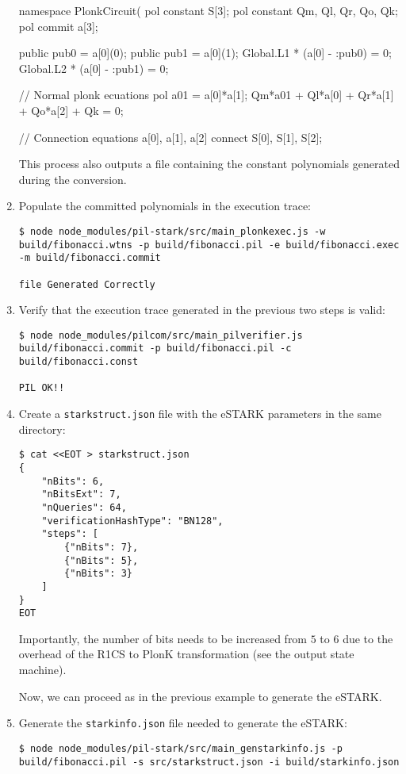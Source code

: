 \begin{enumerate}
\begin{pil}
namespace PlonkCircuit(%
    pol constant S[3];
    pol constant Qm, Ql, Qr, Qo, Qk;
    pol commit a[3];

    public pub0 = a[0](0);
    public pub1 = a[0](1);
    Global.L1 * (a[0] - :pub0) = 0;
    Global.L2 * (a[0] - :pub1) = 0;

// Normal plonk ecuations
    pol a01 = a[0]*a[1];
    Qm*a01 + Ql*a[0] + Qr*a[1] + Qo*a[2] + Qk = 0;

// Connection equations
    {a[0], a[1], a[2]} connect {S[0], S[1], S[2]};
\end{pil}

This process also outputs a file containing the constant polynomials generated during the conversion.

\item Populate the committed polynomials in the execution trace:
\begin{lstlisting}[style=termt]
$ node node_modules/pil-stark/src/main_plonkexec.js -w build/fibonacci.wtns -p build/fibonacci.pil -e build/fibonacci.exec -m build/fibonacci.commit

file Generated Correctly
\end{lstlisting}

\item Verify that the execution trace generated in the previous two steps is valid:
\begin{lstlisting}[style=termt]
$ node node_modules/pilcom/src/main_pilverifier.js build/fibonacci.commit -p build/fibonacci.pil -c build/fibonacci.const

PIL OK!!
\end{lstlisting}

\item Create a \texttt{starkstruct.json} file with the eSTARK parameters in the same directory:
\begin{lstlisting}[style=termt]
$ cat <<EOT > starkstruct.json
{
    "nBits": 6,
    "nBitsExt": 7,
    "nQueries": 64,
    "verificationHashType": "BN128",
    "steps": [
        {"nBits": 7},
        {"nBits": 5},
        {"nBits": 3}
    ]
}
EOT
\end{lstlisting}
Importantly, the number of bits needs to be increased from $5$ to $6$ due to the overhead of the R1CS to PlonK transformation (see the output state machine).

Now, we can proceed as in the previous example to generate the eSTARK.

\item Generate the \texttt{starkinfo.json} file needed to generate the eSTARK:
\begin{lstlisting}[style=termt]
$ node node_modules/pil-stark/src/main_genstarkinfo.js -p build/fibonacci.pil -s src/starkstruct.json -i build/starkinfo.json


\end{lstlisting}
\end{enumerate}
